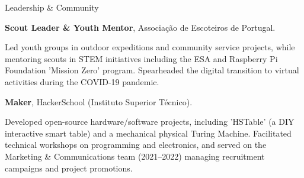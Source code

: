 \begin{rubric}{Leadership \& Community}

\entry*[2016 -- Present]
	\textbf{Scout Leader \& Youth Mentor}, Associação de Escoteiros de Portugal.
	\par
	\small Led youth groups in outdoor expeditions and community service projects, while mentoring scouts in STEM initiatives including the ESA and Raspberry Pi Foundation 'Mission Zero' program. Spearheaded the digital transition to virtual activities during the COVID-19 pandemic.

\entry*[2019 -- 2023]
	\textbf{Maker}, HackerSchool (Instituto Superior Técnico).
	\par
	\small Developed open-source hardware/software projects, including 'HSTable' (a DIY interactive smart table) and a mechanical physical Turing Machine. Facilitated technical workshops on programming and electronics, and served on the Marketing \& Communications team (2021--2022) managing recruitment campaigns and project promotions.

\end{rubric}